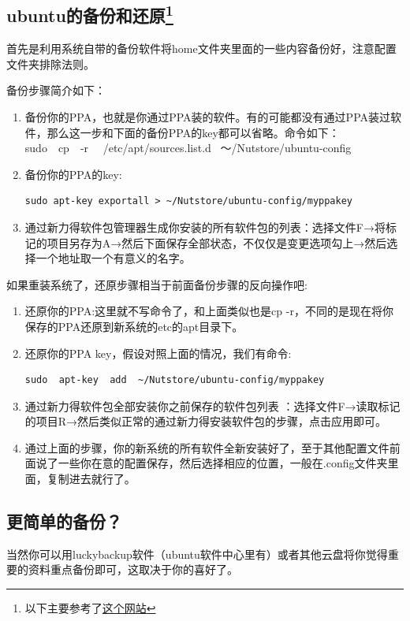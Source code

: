 \documentclass[12pt,oneside]{book}
\begin{document}
\begin{common-format}
\section[ubuntu的备份和还原]{ubuntu的备份和还原\footnote{以下主要参考了\href{http://www.matthartley.com/how-to-backup-your-ubuntu-software/}{这个网站}}}
首先是利用系统自带的备份软件将home文件夹里面的一些内容备份好，注意配置文件夹排除法则。

备份步骤简介如下：
\begin{enumerate}
\item 备份你的PPA，也就是你通过PPA装的软件。有的可能都没有通过PPA装过软件，那么这一步和下面的备份PPA的key都可以省略。命令如下：\\
sudo~~cp~~-r ~~/etc/apt/sources.list.d~ ～/Nutstore/ubuntu-config
\item 备份你的PPA的key:
\begin{Verbatim}
sudo apt-key exportall > ~/Nutstore/ubuntu-config/myppakey
\end{Verbatim}
\item 通过新力得软件包管理器生成你安装的所有软件包的列表：选择文件F→将标记的项目另存为A→然后下面保存全部状态，不仅仅是变更选项勾上→然后选择一个地址取一个有意义的名字。
\end{enumerate}

如果重装系统了，还原步骤相当于前面备份步骤的反向操作吧:
\begin{enumerate}
\item 还原你的PPA:这里就不写命令了，和上面类似也是cp   -r，不同的是现在将你保存的PPA还原到新系统的etc的apt目录下。
\item 还原你的PPA key，假设对照上面的情况，我们有命令:
\begin{Verbatim}
sudo  apt-key  add  ~/Nutstore/ubuntu-config/myppakey
\end{Verbatim}
\item 通过新力得软件包全部安装你之前保存的软件包列表 ：选择文件F→读取标记的项目R→然后类似正常的通过新力得安装软件包的步骤，点击应用即可。
\item 通过上面的步骤，你的新系统的所有软件全新安装好了，至于其他配置文件前面说了一些你在意的配置保存，然后选择相应的位置，一般在.config文件夹里面，复制进去就行了。
\end{enumerate}

\subsection{更简单的备份？}
当然你可以用luckybackup软件（ubuntu软件中心里有）或者其他云盘将你觉得重要的资料重点备份即可，这取决于你的喜好了。


\end{common-format}
\end{document}
